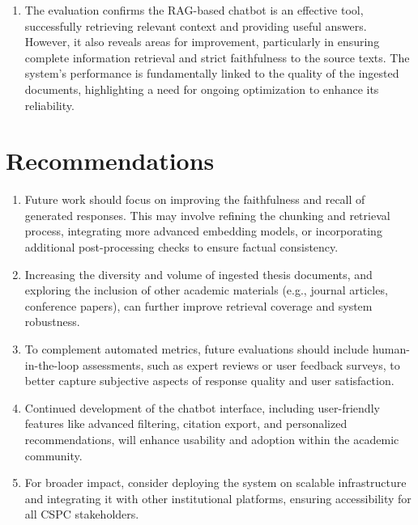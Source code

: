 \begin{refsection}
\begin{enumerate}
    \item The evaluation confirms the RAG-based chatbot is an effective tool, successfully retrieving relevant context and providing useful answers. However, it also reveals areas for improvement, particularly in ensuring complete information retrieval and strict faithfulness to the source texts. The system's performance is fundamentally linked to the quality of the ingested documents, highlighting a need for ongoing optimization to enhance its reliability.
    
\end{enumerate}

\section*{Recommendations}

\begin{enumerate}
    \item Future work should focus on improving the faithfulness and recall of generated responses. This may involve refining the chunking and retrieval process, integrating more advanced embedding models, or incorporating additional post-processing checks to ensure factual consistency.
    \item Increasing the diversity and volume of ingested thesis documents, and exploring the inclusion of other academic materials (e.g., journal articles, conference papers), can further improve retrieval coverage and system robustness.
    \item To complement automated metrics, future evaluations should include human-in-the-loop assessments, such as expert reviews or user feedback surveys, to better capture subjective aspects of response quality and user satisfaction.
    \item Continued development of the chatbot interface, including user-friendly features like advanced filtering, citation export, and personalized recommendations, will enhance usability and adoption within the academic community.
    \item For broader impact, consider deploying the system on scalable infrastructure and integrating it with other institutional platforms, ensuring accessibility for all CSPC stakeholders.
\end{enumerate}

\clearpage

\printbibliography[heading=subbibintoc, title={\centering Notes}]
\end{refsection}